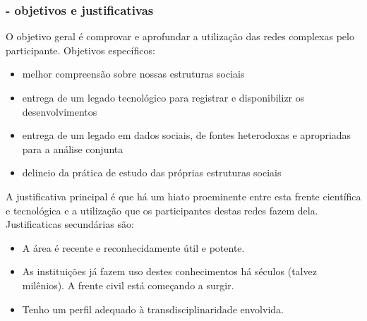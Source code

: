 \documentclass[10pt]{beamer}
\begin{document}
\begin{frame}
\frametitle{- objetivos e justificativas}
O objetivo geral é comprovar e aprofundar a utilização das redes complexas
pelo participante. Objetivos específicos:
\begin{itemize}
	\item melhor compreensão sobre nossas estruturas sociais
	\item entrega de um legado tecnológico para registrar e disponibilizr os desenvolvimentos
	\item entrega de um legado em dados sociais, de fontes heterodoxas e apropriadas para a análise conjunta
	\item delineio da prática de estudo das próprias estruturas sociais 
\end{itemize}

\vspace{.5cm}

A justificativa principal é que há um hiato proeminente
entre esta frente científica e tecnológica e a utilização que
os participantes destas redes fazem dela. Justificaticas secundárias são:
\begin{itemize}
	\item A área é recente e reconhecidamente útil e potente.
	\item As instituições já fazem uso destes conhecimentos
		há séculos (talvez milênios). A frente civil está começando a surgir.
	\item Tenho um perfil adequado à transdisciplinaridade envolvida.
\end{itemize}

\end{frame}
\end{document}
